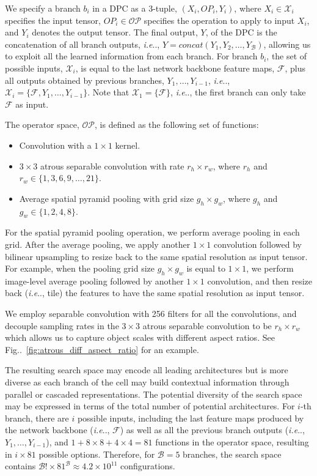 \documentclass{article}
\makeatletter
\def\@onedot{\ifx\@let@token.\else.\null\fi\xspace}
\DeclareRobustCommand\onedot{\futurelet\@let@token\@onedot}
\newcommand{\figref}[1]{Fig\onedot~\ref{#1}}
\def\ie{\emph{i.e}\onedot} \def\Ie{\emph{I.e}\onedot}
\makeatother
\begin{document}
We specify a branch $b_i$ in a DPC as a 3-tuple, $(X_i, OP_i, Y_i)$, where $X_i \in \mathcal{X}_i$ specifies the input tensor, $OP_i \in \mathcal{OP}$ specifies the operation to apply to input $X_i$, and $Y_i$ denotes the output tensor. The final output, $Y$, of the DPC is the concatenation of all branch outputs, \ie, $Y = concat(Y_1, Y_2, \dots, Y_{\mathcal{B}})$, allowing us to exploit all the learned information from each branch. For branch $b_i$, the set of possible inputs, $\mathcal{X}_i$, is equal to the last network backbone feature
maps, $\mathcal{F}$, plus all outputs
obtained by previous branches, $Y_1, \dots, Y_{i-1}$, \ie, $\mathcal{X}_i=\{\mathcal{F}, Y_1, \dots, Y_{i-1}\}$.
Note that $\mathcal{X}_1 = \{\mathcal{F}\}$, \ie, the first branch can only take $\mathcal{F}$ as input.

The operator space, $\mathcal{OP}$, is defined as the following set of functions:

\begin{itemize}
\item Convolution with a $1\times1$ kernel.
\item $3\times3$ atrous separable convolution with rate $r_h \times r_w$, where $r_h$ and $r_w \in \{1, 3, 6, 9, \dots, 21\}$.
\item Average spatial pyramid pooling with grid size $g_h \times g_w$, where $g_h$ and $g_w \in \{1, 2, 4, 8\}$.
\end{itemize}

For the spatial pyramid pooling operation, we perform average pooling in each grid. After the average pooling,
we apply another $1\times1$ convolution followed by bilinear upsampling to resize back to the
same spatial resolution as input tensor. For example, when the pooling grid size $g_h \times g_w$ is equal to $1\times1$,
we perform image-level average pooling followed by another $1\times1$ convolution, and then resize back
(\ie, tile) the features to have the same spatial resolution as input tensor.

We employ separable convolution  \cite{sifre2014rigid,vanhoucke2014learning,wang2016factorized,chollet2016xception,howard2017mobilenets} with 256 filters for all the convolutions, and decouple sampling rates in the $3\times3$ atrous separable
convolution to be $r_h \times r_w$ which allows us to capture object scales with different aspect ratios. See \figref{fig:atrous_diff_aspect_ratio} for an example.



The resulting search space may encode all leading architectures but is more diverse as each branch of the cell may build contextual information through parallel or cascaded representations.
The potential diversity of the search space may be expressed in terms of the total number of potential architectures.
For $i$-th branch, there are $i$ possible inputs, including the last feature maps produced by the network backbone (\ie, $\mathcal{F}$) as well as all the previous branch outputs (\ie, $Y_1, \dots, Y_{i-1}$), and $1 + 8 \times 8 + 4 \times 4 = 81$ functions in the operator space, resulting in $i \times 81$ possible options. Therefore, for $\mathcal{B}=5$ branches, the search space contains $\mathcal{B}! \times 81^{\mathcal{B}} \approx 4.2 \times 10^{11}$ configurations.
\end{document}
